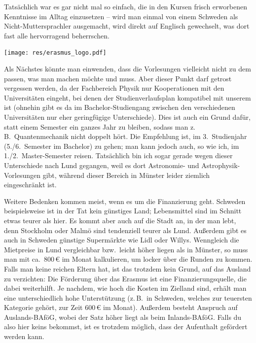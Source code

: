 \begin{multicols}{2}
Tatsächlich war es gar nicht mal so einfach, die in den Kursen frisch erworbenen Kenntnisse im Alltag einzusetzen – wird man einmal von einem Schweden als Nicht-Muttersprachler ausgemacht, wird direkt auf Englisch gewechselt, was dort fast alle hervorragend beherrschen.

\begin{center}
	\texttt{[image: res/erasmus\_logo.pdf]}
\end{center}

Als Nächstes könnte man einwenden, dass die Vorlesungen vielleicht nicht zu dem passen, was man machen möchte und muss.
Aber dieser Punkt darf getrost vergessen werden, da der Fachbereich Physik nur Kooperationen mit den Universitäten eingeht, bei denen der Studienverlaufsplan kompatibel mit unserem ist (ohnehin gibt es da im Bachelor-Studiengang zwischen den verschiedenen Universitäten nur eher geringfügige Unterschiede).
Dies ist auch ein Grund dafür, statt einem Semester ein ganzes Jahr zu bleiben, sodass man z.\,B.\ Quantenmechanik nicht doppelt hört.
Die Empfehlung ist, im 3.~Studienjahr (5./6.~Semester im Bachelor) zu gehen; man kann jedoch auch, so wie ich, im 1./2.~Master-Semester reisen.
Tatsächlich bin ich sogar gerade wegen dieser Unterschiede nach Lund gegangen, weil es dort Astronomie- und Astrophysik-Vorlesungen gibt, während dieser Bereich in Münster leider ziemlich eingeschränkt ist.

Weitere Bedenken kommen meist, wenn es um die Finanzierung geht.
Schweden beispielsweise ist in der Tat kein günstiges Land; Lebensmittel sind im Schnitt etwas teurer als hier. Es kommt aber auch auf die Stadt an, in der man lebt, denn Stockholm oder Malmö sind tendenziell teurer als Lund. Außerdem gibt es auch in Schweden günstige Supermärkte wie Lidl oder Willys.
Wenngleich die Mietpreise in Lund vergleichbar bzw.\ leicht höher liegen als in Münster, so muss man mit ca.~800\,€ im Monat kalkulieren, um locker über die Runden zu kommen.
Falls man keine reichen Eltern hat, ist das trotzdem kein Grund, auf das Ausland zu verzichten:
Die Förderung über das Erasmus ist eine Finanzierungsquelle, die dabei weiterhilft.
Je nachdem, wie hoch die Kosten im Zielland sind, erhält man eine unterschiedlich hohe Unterstützung (z.\,B.\ in Schweden, welches zur teuersten Kategorie gehört, zur Zeit 600\,€ im Monat).
Außerdem besteht Anspruch auf Auslands-BAföG, wobei der Satz höher liegt als beim Inlands-BAföG.
Falls du also hier keins bekommst, ist es trotzdem möglich, dass der Aufenthalt gefördert werden kann.


\end{multicols}
